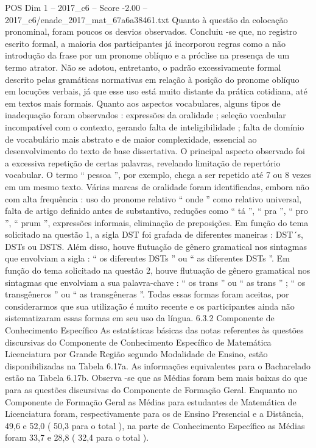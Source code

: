 \begin{textsample}{POS Dim 1 – 2017\_c6 – Score -2.00 – 2017\_c6/enade\_2017\_mat\_67a6a38461.txt}
Quanto à questão da colocação pronominal, foram poucos os desvios observados.
Concluiu -se que, no registro escrito formal, a maioria dos participantes já incorporou regras como a não introdução da frase por um pronome oblíquo e a próclise na presença de um termo atrator.
Não se adotou, entretanto, o padrão excessivamente formal descrito pelas gramáticas normativas em relação à posição do pronome oblíquo em locuções verbais, já que esse uso está muito distante da prática cotidiana, até em textos mais formais.
Quanto aos aspectos vocabulares, alguns tipos de inadequação foram observados : expressões da oralidade ; seleção vocabular incompatível com o contexto, gerando falta de inteligibilidade ; falta de domínio de vocabulário mais abstrato e de maior complexidade, essencial ao desenvolvimento do texto de base dissertativa.
O principal aspecto observado foi a excessiva repetição de certas palavras, revelando limitação de repertório vocabular.
O termo “ pessoa ”, por exemplo, chega a ser repetido até 7 ou 8 vezes em um mesmo texto.
Várias marcas de oralidade foram identificadas, embora não com alta frequência : uso do pronome relativo “ onde ” como relativo universal, falta de artigo definido antes de substantivo, reduções como “ tá ”, “ pra ”, “ pro ”, “ prum ”, expressões informais, eliminação de preposições.
Em função do tema solicitado na questão 1, a sigla DST foi grafada de diferentes maneiras : DST´s, DSTs ou DSTS.
Além disso, houve flutuação de gênero gramatical nos sintagmas que envolviam a sigla : “ os diferentes DSTs ” ou “ as diferentes DSTs ”.
Em função do tema solicitado na questão 2, houve flutuação de gênero gramatical nos sintagmas que envolviam a sua palavra-chave : “ os trans ” ou “ as trans ” ; “ os transgêneros ” ou “ as transgêneras ”.
Todas essas formas foram aceitas, por considerarmos que sua utilização é muito recente e os participantes ainda não sistematizaram essas formas em seu uso da língua. 6.3.2 Componente de Conhecimento Específico As estatísticas básicas das notas referentes às questões discursivas do Componente de Conhecimento Específico de Matemática Licenciatura por Grande Região segundo Modalidade de Ensino, estão disponibilizadas na Tabela 6.17a.
As informações equivalentes para o Bacharelado estão na Tabela 6.17b.
Observa -se que as Médias foram bem mais baixas do que para as questões discursivas do Componente de Formação Geral.
Enquanto no Componente de Formação Geral as Médias para estudantes de Matemática de Licenciatura foram, respectivamente para os de Ensino Presencial e a Distância, 49,6 e 52,0 ( 50,3 para o total ), na parte de Conhecimento Específico as Médias foram 33,7 e 28,8 ( 32,4 para o total ).

\end{textsample}
